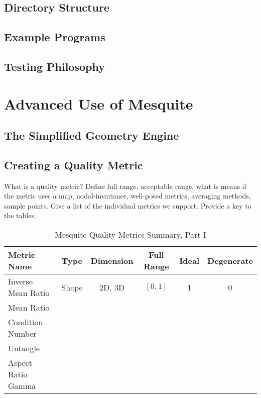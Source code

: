 \subsection{Directory Structure}

\subsection{Example Programs}

\subsection{Testing Philosophy}

\section{Advanced Use of Mesquite}

\subsection{The Simplified Geometry Engine}

\subsection{Creating a Quality Metric}
What is a quality metric? Define full range, acceptable range, what is means 
if the metric uses a map, nodal-invariance, well-posed metrics, averaging 
methods, sample points. Give a list of the individual metrics we support. 
Provide a key to the tables.

\begin{table}[h]
\begin{center}
\begin{tabular}{|l|c|c|c|c|c|}
\hline
Metric Name & Type & Dimension & Full Range & Ideal & Degenerate \\ \hline
Inverse Mean Ratio & Shape & 2D, 3D & $[0,1]$ & 1 & 0 \\ 
Mean Ratio &  &  &  &  &  \\ 
Condition Number &  &  &  &  &  \\ 
Untangle &  &  &  &  &  \\ 
Aspect Ratio Gamma &  &  &  &  &  \\ 
\hline
\end{tabular}
\caption{\label{QualityMetrics1} Mesquite Quality Metrics Summary, Part I}
\end{center}
\end{table}

